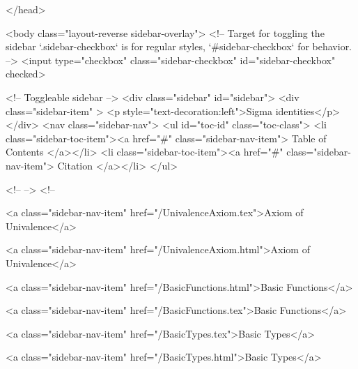   
</head>




  <body class="layout-reverse sidebar-overlay">
    <!-- Target for toggling the sidebar `.sidebar-checkbox` is for regular
     styles, `#sidebar-checkbox` for behavior. -->
<input type="checkbox" class="sidebar-checkbox" id="sidebar-checkbox" checked>

<!-- Toggleable sidebar -->
<div class="sidebar" id="sidebar">
  <div class="sidebar-item" >
    <p style="text-decoration:left">Sigma identities</p>
  </div>
  <nav class="sidebar-nav">
    <ul id="toc-id" class="toc-class">
  <li class="sidebar-toc-item"><a href="#" class="sidebar-nav-item"> Table of Contents </a></li>
  <li class="sidebar-toc-item"><a href="#" class="sidebar-nav-item"> Citation </a></li>
</ul>


    <!--  -->
    <!-- 
      
    
      
    
      
    
      
    
      
        
      
    
      
        
          <a class="sidebar-nav-item" href="/UnivalenceAxiom.tex">Axiom of Univalence</a>
        
      
    
      
        
          <a class="sidebar-nav-item" href="/UnivalenceAxiom.html">Axiom of Univalence</a>
        
      
    
      
        
          <a class="sidebar-nav-item" href="/BasicFunctions.html">Basic Functions</a>
        
      
    
      
        
          <a class="sidebar-nav-item" href="/BasicFunctions.tex">Basic Functions</a>
        
      
    
      
        
          <a class="sidebar-nav-item" href="/BasicTypes.tex">Basic Types</a>
        
      
    
      
        
          <a class="sidebar-nav-item" href="/BasicTypes.html">Basic Types</a>
        
      
    
